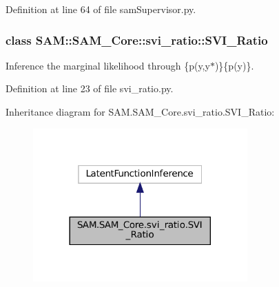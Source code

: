 Definition at line 64 of file sam\+Supervisor.\+py.

\label{classSAM_1_1SAM__Core_1_1svi__ratio_1_1SVI__Ratio}
\subsubsection{class S\+AM\+:\+:S\+A\+M\+\_\+\+Core\+:\+:svi\+\_\+ratio\+:\+:S\+V\+I\+\_\+\+Ratio}
Inference the marginal likelihood through \{p(y,y$\ast$)\}\{p(y)\}. 

Definition at line 23 of file svi\+\_\+ratio.\+py.



Inheritance diagram for S\+A\+M.\+S\+A\+M\+\_\+\+Core.\+svi\+\_\+ratio.\+S\+V\+I\+\_\+\+Ratio\+:
\nopagebreak
\begin{figure}[H]
\begin{center}
\leavevmode
\includegraphics[width=233pt]{classSAM_1_1SAM__Core_1_1svi__ratio_1_1SVI__Ratio__inherit__graph}
\end{center}
\end{figure}
